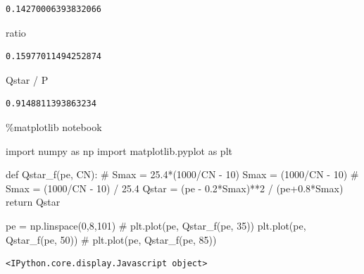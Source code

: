 \documentclass[
  letterpaper,
  DIV=11,
  numbers=noendperiod]{scrreprt}
\newenvironment{Shaded}{\begin{snugshade}}{\end{snugshade}}
\newcommand{\CommentTok}[1]{\textcolor[rgb]{0.37,0.37,0.37}{#1}}
\newcommand{\ControlFlowTok}[1]{\textcolor[rgb]{0.00,0.23,0.31}{#1}}
\newcommand{\DecValTok}[1]{\textcolor[rgb]{0.68,0.00,0.00}{#1}}
\newcommand{\FloatTok}[1]{\textcolor[rgb]{0.68,0.00,0.00}{#1}}
\newcommand{\ImportTok}[1]{\textcolor[rgb]{0.00,0.46,0.62}{#1}}
\newcommand{\KeywordTok}[1]{\textcolor[rgb]{0.00,0.23,0.31}{#1}}
\newcommand{\NormalTok}[1]{\textcolor[rgb]{0.00,0.23,0.31}{#1}}
\newcommand{\OperatorTok}[1]{\textcolor[rgb]{0.37,0.37,0.37}{#1}}
\begin{document}
\begin{verbatim}
0.14270006393832066
\end{verbatim}

\begin{Shaded}
\begin{Highlighting}[]
\NormalTok{ratio}
\end{Highlighting}
\end{Shaded}

\begin{verbatim}
0.15977011494252874
\end{verbatim}

\begin{Shaded}
\begin{Highlighting}[]
\NormalTok{Qstar }\OperatorTok{/}\NormalTok{ P}
\end{Highlighting}
\end{Shaded}

\begin{verbatim}
0.9148811393863234
\end{verbatim}

\begin{Shaded}
\begin{Highlighting}[]
\OperatorTok{\%}\NormalTok{matplotlib notebook}

\ImportTok{import}\NormalTok{ numpy }\ImportTok{as}\NormalTok{ np}
\ImportTok{import}\NormalTok{ matplotlib.pyplot }\ImportTok{as}\NormalTok{ plt}

\KeywordTok{def}\NormalTok{ Qstar\_f(pe, CN):}
\CommentTok{\#     Smax = 25.4*(1000/CN {-} 10)}
\NormalTok{    Smax }\OperatorTok{=}\NormalTok{ (}\DecValTok{1000}\OperatorTok{/}\NormalTok{CN }\OperatorTok{{-}} \DecValTok{10}\NormalTok{)}
\CommentTok{\#     Smax = (1000/CN {-} 10) / 25.4}
\NormalTok{    Qstar }\OperatorTok{=}\NormalTok{ (pe }\OperatorTok{{-}} \FloatTok{0.2}\OperatorTok{*}\NormalTok{Smax)}\OperatorTok{**}\DecValTok{2} \OperatorTok{/}\NormalTok{ (pe}\OperatorTok{+}\FloatTok{0.8}\OperatorTok{*}\NormalTok{Smax)}
    \ControlFlowTok{return}\NormalTok{ Qstar}

\NormalTok{pe }\OperatorTok{=}\NormalTok{ np.linspace(}\DecValTok{0}\NormalTok{,}\DecValTok{8}\NormalTok{,}\DecValTok{101}\NormalTok{)}
\CommentTok{\# plt.plot(pe, Qstar\_f(pe, 35))}
\NormalTok{plt.plot(pe, Qstar\_f(pe, }\DecValTok{50}\NormalTok{))}
\CommentTok{\# plt.plot(pe, Qstar\_f(pe, 85))}
\end{Highlighting}
\end{Shaded}

\begin{verbatim}
<IPython.core.display.Javascript object>
\end{verbatim}
\end{document}
